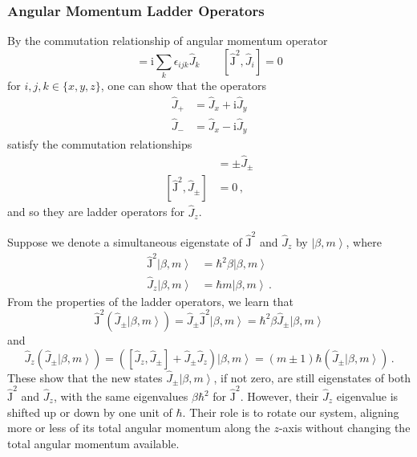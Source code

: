 \documentclass{article}
\theoremstyle{plain}\theoremheaderfont{\normalfont\itshape}\theorembodyfont{\rmfamily}\theoremseparator{.}\newtheorem*{rem}{Remark}\newtheorem*{ex}{Example}\newtheorem*{proof}{Proof}\newtheorem*{altp}{Alternative proof}
\theoremstyle{plain}\theoremheaderfont{\normalfont\bfseries}\theorembodyfont{\rmfamily}\theoremseparator{.}\newtheorem{thm}{Theorem}[section]\newtheorem{lem}[thm]{Lemma}\newtheorem{prop}[thm]{Proposition}\newtheorem*{cor}{Corollary}\newtheorem{defn}[thm]{Definition}\newtheorem{clm}[thm]{Claim}\newtheorem{clminproof}{Claim}
\theoremstyle{break}\theoremheaderfont{\normalfont\itshape}\theorembodyfont{\rmfamily}\theoremseparator{.\medskip}\newtheorem*{proofskip}{Proof}\newtheorem*{exs}{Examples}\newtheorem*{rems}{Remarks}
\theoremstyle{break}\theoremheaderfont{\normalfont\bfseries}\theorembodyfont{\rmfamily}\theoremseparator{.\medskip}\newtheorem{lemskip}[thm]{Lemma}\newtheorem{defnskip}[thm]{Definition}\newtheorem{propskip}[thm]{Proposition}\newtheorem{thmskip}[thm]{Theorem}
\numberwithin{equation}{section}
\newcommand{\ii}{\mathrm{i}}
\newcommand{\ket}[1]{\left| #1 \right\rangle}
\newcommand{\vb}[1]{\bm{\mathrm{#1}}}
\begin{document}
        \subsubsection{Angular Momentum Ladder Operators}
    By the commutation relationship of angular momentum operator
    \begin{equation}
        [\hat{J}_i,\hat{J}_j]=\ii\sum_k\epsilon_{ijk}\hat{J}_k\qquad [\hat{\vb{J}}^2,\hat{J}_i]=0
    \end{equation}
    for \(i,j,k\in\{x,y,z\}\), one can show that the operators
    \begin{align}
        \hat{J}_+&=\hat{J}_x+\ii\hat{J}_y\\
        \hat{J}_-&=\hat{J}_x-\ii\hat{J}_y
    \end{align}
    satisfy the commutation relationships
    \begin{align}
        [\hat{J}_z,\hat{J}_\pm]&=\pm\hat{J}_\pm \\
        [\hat{\vb{J}}^2,\hat{J}_\pm]&=0\,,
    \end{align}
    and so they are ladder operators for \(\hat{J}_z\).

    Suppose we denote a simultaneous eigenstate of \(\hat{\vb{J}}^2\) and \(\hat{J}_z\) by \(\ket{\beta,m}\), where
    \begin{align}
        \hat{\vb{J}}^2\ket{\beta,m}&=\hbar^2\beta\ket{\beta,m} \\
        \hat{J}_z\ket{\beta,m}&=\hbar m\ket{\beta,m}\,.
    \end{align} 
    From the properties of the ladder operators, we learn that
    \begin{equation}
        \hat{\vb{J}}^2(\hat{J}_\pm\ket{\beta,m})=\hat{J}_\pm\hat{\vb{J}}^2\ket{\beta,m}=\hbar^2\beta \hat{J}_\pm \ket{\beta,m}
    \end{equation}
    and
    \begin{equation}
        \hat{J}_z(\hat{J}_\pm\ket{\beta,m})=([\hat{J}_z,\hat{J}_\pm]+\hat{J}_\pm \hat{J}_z)\ket{\beta,m}=(m\pm 1)\hbar(\hat{J}_\pm\ket{\beta,m})\,.
    \end{equation}
    These show that the new states \(\hat{J}_\pm\ket{\beta,m}\), if not zero, are still eigenstates of both \(\hat{\vb{J}}^2\) and \(\hat{J}_z\), with the same eigenvalues \(\beta\hbar^2\) for \(\hat{\vb{J}}^2\). However, their \(\hat{J}_z\) eigenvalue is shifted up or down by one unit of \(\hbar\). Their role is to rotate our system, aligning more or less of its total angular momentum along the \(z\)-axis without changing the total angular momentum available.
\end{document}
